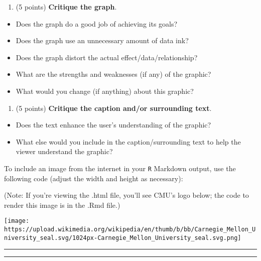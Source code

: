 \documentclass[]{article}
\providecommand{\tightlist}{%
  \setlength{\itemsep}{0pt}\setlength{\parskip}{0pt}}
\begin{document}
\begin{enumerate}
\def\labelenumi{\alph{enumi}.}
\setcounter{enumi}{2}
\tightlist
\item
  (5 points) \textbf{Critique the graph}.
\end{enumerate}

\begin{itemize}
\tightlist
\item
  Does the graph do a good job of achieving its goals?
\item
  Does the graph use an unnecessary amount of data ink?
\item
  Does the graph distort the actual effect/data/relationship?
\item
  What are the strengths and weaknesses (if any) of the graphic?
\item
  What would you change (if anything) about this graphic?
\end{itemize}

\begin{enumerate}
\def\labelenumi{\alph{enumi}.}
\setcounter{enumi}{3}
\tightlist
\item
  (5 points) \textbf{Critique the caption and/or surrounding text}.
\end{enumerate}

\begin{itemize}
\tightlist
\item
  Does the text enhance the user's understanding of the graphic?
\item
  What else would you include in the caption/surrounding text to help
  the viewer understand the graphic?
\end{itemize}

To include an image from the internet in your \texttt{R} Markdown
output, use the following code (adjust the width and height as
necessary):

(Note: If you're viewing the .html file, you'll see CMU's logo below;
the code to render this image is in the .Rmd file.)

\texttt{[image: https://upload.wikimedia.org/wikipedia/en/thumb/b/bb/Carnegie\_Mellon\_University\_seal.svg/1024px-Carnegie\_Mellon\_University\_seal.svg.png]}

\begin{center}\rule{0.5\linewidth}{\linethickness}\end{center}

\begin{center}\rule{0.5\linewidth}{\linethickness}\end{center}
\end{document}
